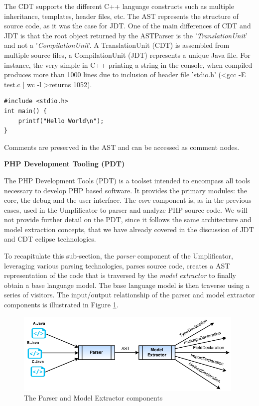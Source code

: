 The CDT supports the different C++ language constructs such as multiple inheritance, templates, header files, etc.
The AST represents the structure of source code, as it was the case for JDT.  One of the main differences of CDT and JDT is that the root object returned by the ASTParser is the '\textit{TranslationUnit}' and not a '\textit{CompilationUnit}'. 
A TranslationUnit (CDT) is assembled from multiple source files, a CompilationUnit (JDT) represents a unique Java file.
For instance, the very simple in C++ printing a string in the console, when compiled produces more than 1000 lines due to inclusion of header file 'stdio.h' (\textless gcc -E test.c | wc -l \textgreater returns 1052).

\begin{lstlisting}[style=java, caption=Simple Example in C++ - test.c , label=lst:cdtsimple]
#include <stdio.h>
int main() {
	printf("Hello World\n");
}
\end{lstlisting}

Comments are preserved in the AST and can be accessed as comment nodes.

\textbf{PHP Development Tooling (PDT)}

The PHP Development Tools (PDT) is a toolset intended to encompass all tools necessary to develop PHP based software. 
It provides the primary modules: the core, the debug and the user interface. The \textit{core} component is, as in the previous cases, used in the Umplificator to parser and analyze PHP source code.
We will not provide further detail on the PDT, since it follows the same architecture and model extraction concepts, that we have already covered in the discussion of JDT and CDT eclipse technologies.

To recapitulate this sub-section, the \textit{parser} component of the Umplificator, leveraging various parsing technologies, parses source code, creates a AST representation of the code that is traversed by the \textit{model extractor} to finally obtain a base language model. The base language model is then traverse using a series of visitors. The input/output relationship of the parser and model extractor components is illustrated in Figure \ref{fig:parserINOut}. 

\begin{figure}[h]
\centering
\includegraphics[width=0.98\textwidth]{Figures/parserINOut.png}
\caption{The Parser and Model Extractor components}
\label{fig:parserINOut}
\end{figure}

